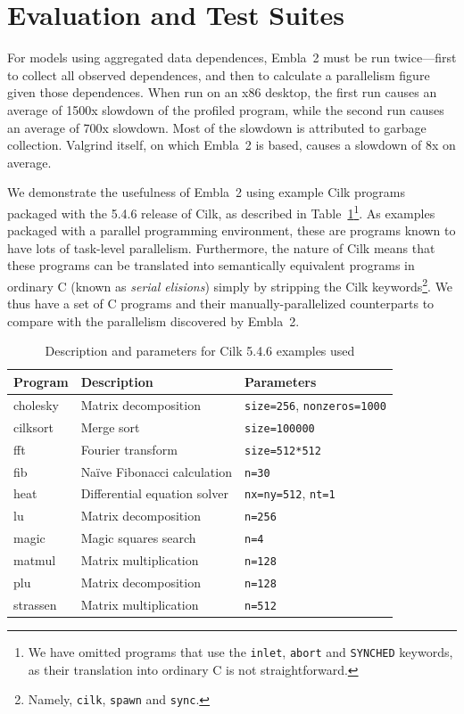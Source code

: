 \section{Evaluation and Test Suites} \label{sresults}

For models using aggregated data dependences, Embla~2 must be run twice---first
to collect all observed dependences, and then to calculate a parallelism figure
given those dependences. When run on an x86 desktop, the first run causes an
average of 1500x slowdown of the profiled program, while the second run causes
an average of 700x slowdown.  Most of the slowdown is attributed to garbage
collection.  Valgrind itself, on which Embla~2 is based, causes a slowdown of
8x on average.

We demonstrate the usefulness of Embla~2 using example Cilk programs packaged with the 5.4.6 release of Cilk,
as described in Table~\ref{cilk-ex}\footnote{We
have omitted programs that use the \texttt{inlet}, \texttt{abort} and \texttt{SYNCHED} keywords,
as their translation into ordinary C is not straightforward.}.
As examples packaged with a parallel programming environment,
these are programs known to have lots of task-level parallelism.
Furthermore, the nature of Cilk means that these programs can be translated into semantically equivalent programs in ordinary C (known as \emph{serial elisions}) simply by stripping the Cilk keywords\footnote{Namely,
\texttt{cilk}, \texttt{spawn} and \texttt{sync}.}.
We thus have a set of C programs and their manually-parallelized counterparts to compare with the parallelism discovered by Embla~2.

\begin{table}[t]
\centering
\scriptsize
\begin{tabular}{ | l | l | l | }
\hline
Program & Description & Parameters \\
\hline
\textsf{cholesky} & Matrix decomposition & \texttt{size=256}, \texttt{nonzeros=1000} \\
\textsf{cilksort} & Merge sort & \texttt{size=100000} \\
\textsf{fft} & Fourier transform & \texttt{size=512*512} \\
\textsf{fib} & Na\"ive Fibonacci calculation & \texttt{n=30} \\
\textsf{heat} & Differential equation solver & \texttt{nx=ny=512}, \texttt{nt=1} \\ 
\textsf{lu} & Matrix decomposition & \texttt{n=256} \\
\textsf{magic} & Magic squares search & \texttt{n=4} \\
\textsf{matmul} & Matrix multiplication & \texttt{n=128} \\
\textsf{plu} & Matrix decomposition & \texttt{n=128} \\
\textsf{strassen} & Matrix multiplication & \texttt{n=512} \\
\hline
\end{tabular}
\small
\label{cilk-ex}
\caption{Description and parameters for Cilk 5.4.6 examples used}
\end{table}

